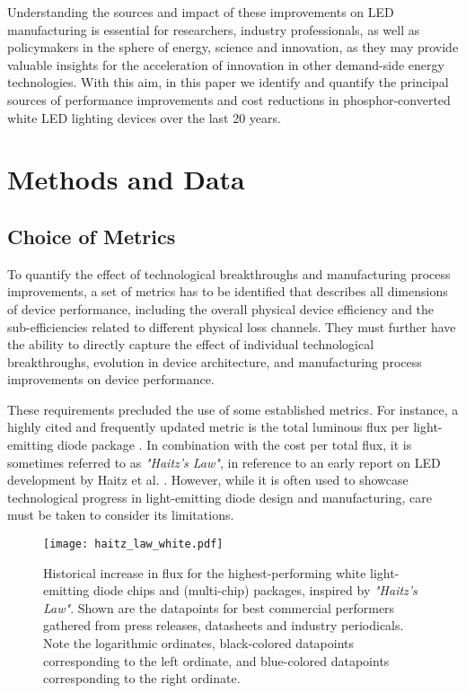 \documentclass[a4paper,nocompress]{spie}  %
\begin{document}
    Understanding the sources and impact of these improvements on LED manufacturing is essential for researchers, industry professionals, as well as policymakers in the sphere of energy, science and innovation, as they may provide valuable insights for the acceleration of innovation in other demand-side energy technologies. With this aim, in this paper we identify and quantify the principal sources of performance improvements and cost reductions in phosphor-converted white LED lighting devices over the last 20 years. 

\section{Methods and Data}
\label{sec:methods}

\subsection{Choice of Metrics}
\label{subsec:metrics}

    To quantify the effect of technological breakthroughs and manufacturing process improvements, a set of metrics has to be identified that describes all dimensions of device performance, including the overall physical device efficiency and the sub-efficiencies related to different physical loss channels. They must further have the ability to directly capture the effect of individual technological breakthroughs, evolution in device architecture, and manufacturing process improvements on device performance.
    
    These requirements precluded the use of some established metrics. For instance, a highly cited and frequently updated metric is the total luminous flux per light-emitting diode package \cite{Liu2009,haitz2011solid,cho2017white,Fontoynont2018}. In combination with the cost per total flux, it is sometimes referred to as \textit{"Haitz's Law"}, in reference to an early report on LED development by Haitz et al. \cite{haitz1999case}. However, while it is often used to showcase technological progress in light-emitting diode design and manufacturing, care must be taken to consider its limitations.
    
    \begin{figure} [ht]
        \begin{center}
            \texttt{[image: haitz\_law\_white.pdf]}
        \end{center}
        \caption{Historical increase in flux for the highest-performing white light-emitting diode chips and (multi-chip) packages, inspired by \textit{"Haitz's Law"}\cite{haitz1999case}. Shown are the datapoints for best commercial performers gathered from press releases, datasheets and industry periodicals. Note the logarithmic ordinates, black-colored datapoints corresponding to the left ordinate, and blue-colored datapoints corresponding to the right ordinate.}
        \label{fig:haitz}
    \end{figure}
    
\end{document}
